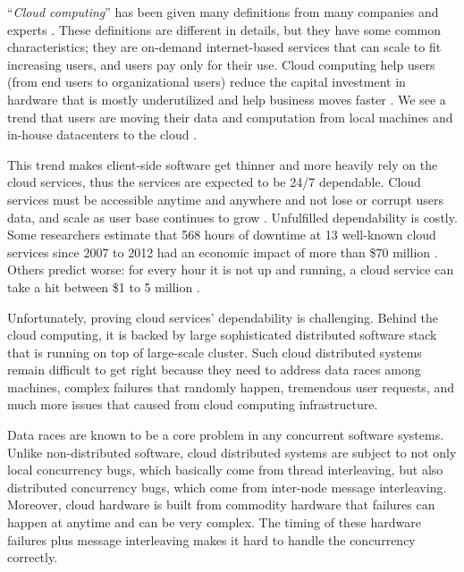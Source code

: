``\textit{Cloud computing}'' has been given many definitions from many companies
and experts \cite{TwentyoneCloudDef, IBMCloudDef, PCMagCloudDef,
Foster+08-CloudAndGrid}. These definitions are different in details, but they
have some common characteristics; they are on-demand internet-based services
that can scale to fit increasing users, and users pay only for their use.
%
Cloud computing help users (from end users to organizational users) reduce the
capital investment in hardware that is mostly underutilized
\cite{Hayes+08-CloudComputing} and help business moves faster
\cite{Marston+11-CloudBusiness}. We see a trend that users are moving their data
and computation from local machines and in-house datacenters to the cloud
\cite{AdobeCloudStat, AWSCustomer, GmailStat, GoogleDriveStat, DropboxStat,
AstroInCloud, FacebookStat, Luo+16-BigDataBioResearch}.

This trend makes client-side software get thinner and more heavily rely on the
cloud services, thus the services are expected to be 24/7 dependable. Cloud
services must be accessible anytime and anywhere and not lose or corrupt users
data, and scale as user base continues to grow \cite{Buyya+09-Cloud5thUtil}.
%
Unfulfilled dependability is costly. Some researchers estimate that 568 hours of
downtime at 13 well-known cloud services since 2007 to 2012 had an economic
impact of more than \$70 million \cite{Essers12-70Million}. Others predict
worse: for every hour it is not up and running, a cloud service can take a hit
between \$1 to 5 million \cite{Linthicum13-InfoworldCostOutages}.

Unfortunately, proving cloud services' dependability is challenging. Behind the
cloud computing, it is backed by large sophisticated distributed software stack
\cite{Burrows06-Chubby, Chang+06-BigTable, Chapin+95-Hive, Corbett+12-Spanner,
DeanGhemawat04-MapReduce, DeCandia+07-Dynamo, Ghemawat+03-GoogleFS,
Hunt+10-ZooKeeperPaper, Lakshman+09-Cassandra, Melnik+10-DremelInteractive,
Zaharia+12-RDD} that is running on top of large-scale cluster.
Such cloud distributed systems remain difficult to get right because they need
to address data races among machines, complex failures that randomly happen,
tremendous user requests, and much more issues that caused from cloud computing
infrastructure.

Data races are known to be a core problem in any concurrent software systems.
Unlike non-distributed software, cloud distributed systems are subject to not
only local concurrency bugs, which basically come from thread interleaving, but
also distributed concurrency bugs, which come from inter-node message
interleaving.  Moreover, cloud hardware is built from commodity hardware that
failures can happen at anytime and can be very complex. The timing of these
hardware failures plus message interleaving makes it hard to handle the
concurrency correctly.

